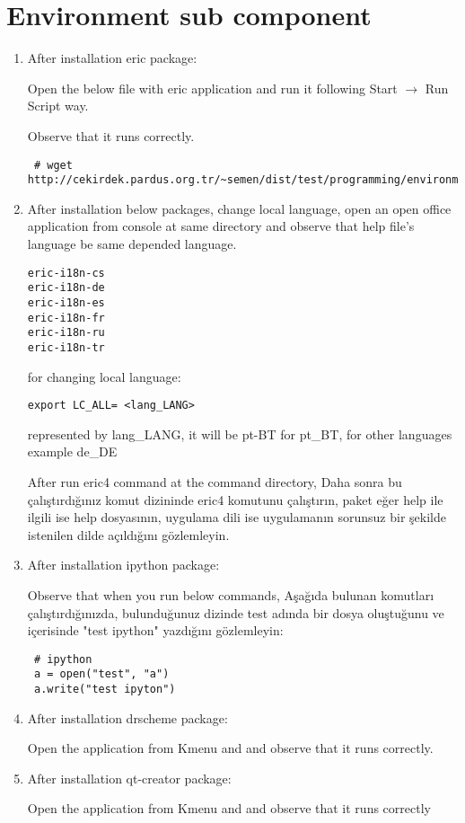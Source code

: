 \documentclass[a4paper,10pt]{article}
\begin{document}
\section{Environment sub component}
\begin{enumerate}
 \item After installation eric package:
 
Open the below file with eric application and run it following Start $\rightarrow$ Run Script way. 

Observe that it runs correctly.
\begin{verbatim}
 # wget http://cekirdek.pardus.org.tr/~semen/dist/test/programming/environment/test.py
\end{verbatim}
 \item After installation below packages, change local language, open an open office application from console at same directory and observe that help file's language be same depended language.
\begin{verbatim}
eric-i18n-cs
eric-i18n-de
eric-i18n-es
eric-i18n-fr
eric-i18n-ru
eric-i18n-tr
 \end{verbatim}

for changing local language:
\begin{verbatim}
export LC_ALL= <lang_LANG>
\end{verbatim}

represented by lang\_LANG, it will be pt-BT for pt\_BT, for other languages example de\_DE

After run eric4 command at the command directory,
Daha sonra bu çalıştırdığınız komut dizininde eric4 komutunu çalıştırın, paket eğer help ile ilgili ise help dosyasının, uygulama dili ise uygulamanın sorunsuz bir şekilde istenilen dilde açıldığını gözlemleyin.

\item After installation ipython package: 

Observe that when you run below commands,
Aşağıda bulunan komutları çalıştırdığınızda, bulunduğunuz dizinde test adında bir dosya oluştuğunu ve içerisinde "test ipython" yazdığını gözlemleyin:
\begin{verbatim}
 # ipython
 a = open("test", "a")
 a.write("test ipyton")
\end{verbatim}

\item After installation drscheme package:

Open the application from Kmenu and and observe that it runs correctly.

\item After installation qt-creator package:

Open the application from Kmenu and and observe that it runs correctly
\end{enumerate}
\end{document}
